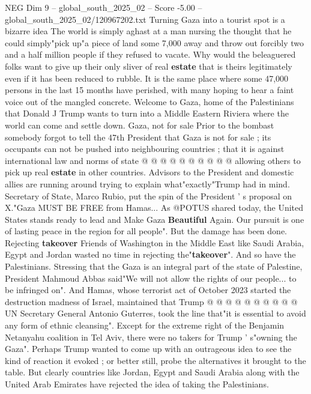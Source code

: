 \begin{textsample}{NEG Dim 9 – global\_south\_2025\_02 – Score -5.00 – global\_south\_2025\_02/120967202.txt}  \label{ex:f9_neg_058}
Turning Gaza into a tourist spot is a bizarre idea The world is simply aghast at a man nursing the thought that he could simply"pick up"a piece of land some 7,000 away and throw out forcibly two and a half million people if they refused to vacate.
Why would the beleaguered folks want to give up their only sliver of real \textbf{estate} that is theirs legitimately even if it has been reduced to rubble.
It is the same place where some 47,000 persons in the last 15 months have perished, with many hoping to hear a faint voice out of the mangled concrete.
Welcome to Gaza, home of the Palestinians that Donald J Trump wants to turn into a Middle Eastern Riviera where the world can come and settle down.
Gaza, not for sale Prior to the bombast somebody forgot to tell the 47th President that Gaza is not for sale ; its occupants can not be pushed into neighbouring countries ; that it is against international law and norms of state @ @ @ @ @ @ @ @ @ @ allowing others to pick up real \textbf{estate} in other countries.
Advisors to the President and domestic allies are running around trying to explain what"exactly"Trump had in mind.
Secretary of State, Marco Rubio, put the spin of the President ' s proposal on X."Gaza MUST BE FREE from Hamas...
As @POTUS shared today, the United States stands ready to lead and Make Gaza \textbf{Beautiful} Again.
Our pursuit is one of lasting peace in the region for all people".
But the damage has been done.
Rejecting \textbf{takeover} Friends of Washington in the Middle East like Saudi Arabia, Egypt and Jordan wasted no time in rejecting the"\textbf{takeover}".
And so have the Palestinians.
Stressing that the Gaza is an integral part of the state of Palestine, President Mahmoud Abbas said"We will not allow the rights of our people... to be infringed on".
And Hamas, whose terrorist act of October 2023 started the destruction madness of Israel, maintained that Trump @ @ @ @ @ @ @ @ @ @ UN Secretary General Antonio Guterres, took the line that"it is essential to avoid any form of ethnic cleansing".
Except for the extreme right of the Benjamin Netanyahu coalition in Tel Aviv, there were no takers for Trump ' s"owning the Gaza".
Perhaps Trump wanted to come up with an outrageous idea to see the kind of reaction it evoked ; or better still, probe the alternatives it brought to the table.
But clearly countries like Jordan, Egypt and Saudi Arabia along with the United Arab Emirates have rejected the idea of taking the Palestinians.

\end{textsample}
